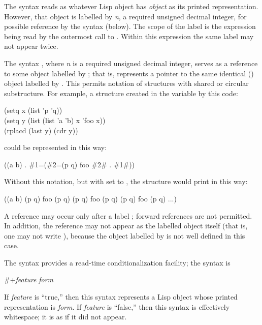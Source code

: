 \begin{flushdesc}
\item[\cd{\#{\it n}{\Xequal}}]
The syntax  reads as whatever Lisp object
has {\it object} as its printed representation.  However, that object
is labelled by {\it n}, a required unsigned decimal integer, for
possible reference by the syntax  (below).
The scope of the label is the expression being read by the outermost
call to .  Within this expression
the same label may not appear twice.

\item[\cd{\#{\it n}\#}]
The syntax , where {\it n} is a required unsigned decimal integer,
serves as a reference to some object labelled by ;
that is,  represents a pointer to the same identical
() object labelled by .
This permits notation of structures with shared or circular substructure.
For example, a structure created in the variable  by this code:
\begin{lisp}
(setq x (list 'p 'q)) \\
(setq y (list (list 'a 'b) x 'foo x)) \\
(rplacd (last y) (cdr y))
\end{lisp}
could be represented in this way:
\begin{lisp}
((a b) . \#1=(\#2=(p q) foo \#2\# . \#1\#))
\end{lisp}
Without this notation, but with  set to ,
the structure would print in this way:
\begin{lisp}
((a b) (p q) foo (p q) (p q) foo (p q) (p q) foo (p q) ...)
\end{lisp}
A reference  may occur only after a label ;
forward references are not permitted.  In addition, the reference
may not appear as the labelled object itself (that is,
one may not write ), because the object
labelled by  is not well defined in this case.

\item[\cd{\#+}]
\label{READ-TIME-CONDITIONAL}
The \cd{\#+} syntax provides a read-time conditionalization facility;
the syntax is
\begin{lisp}
\#+{\it feature} {\it form}
\end{lisp}
If {\it feature} is ``true,'' then this syntax represents a Lisp object
whose printed representation is {\it form}.  If {\it feature} is ``false,''
then this syntax is effectively whitespace; it is as if it did not appear.


\end{flushdesc}
